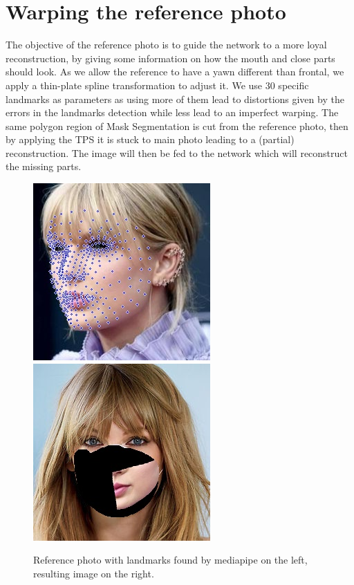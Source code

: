 \documentclass[10pt,twocolumn,letterpaper]{article}
\begin{document}
\section{Warping the reference photo}
The objective of the reference photo is to guide the network to a more loyal
reconstruction, by giving some information on how the mouth and close parts
should look. As we allow the reference to have a yawn different than frontal, we
apply a thin-plate spline transformation to adjust it. We use 30 specific
landmarks as parameters as using more of them lead to distortions given by the
errors in the landmarks detection while less lead to an imperfect warping. The
same polygon region of Mask Segmentation is cut from the reference photo, then by
applying the TPS it is stuck to main photo leading to a (partial)
reconstruction. The image will then be fed to the network which will
reconstruct the missing parts.
\begin{figure}
  \caption{Reference photo with landmarks found by mediapipe on the left,
  resulting image on the right.}
  \includegraphics[width=0.49\linewidth]{img/landmarks_lateral.jpeg}
  \includegraphics[width=0.49\linewidth]{img/result.jpg}
\end{figure}
\end{document}
